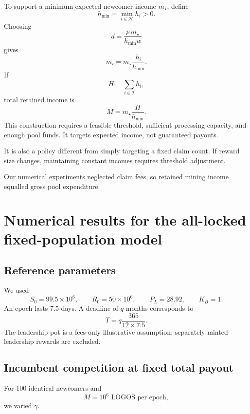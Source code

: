 \documentclass[11pt,a4paper]{article}
\begin{document}
To support a minimum expected newcomer income $m_\star$, define
\begin{equation}
h_{\min}=\min_{i\in\mathcal N}h_i>0.
\end{equation}
Choosing
\begin{equation}
d=\frac{p\,m_\star}{h_{\min}w}
\end{equation}
gives
\begin{equation}
m_i=m_\star\frac{h_i}{h_{\min}}.
\end{equation}
If
\begin{equation}
H=\sum_{i\in\mathcal I}h_i,
\end{equation}
total retained income is
\begin{equation}
M=m_\star\frac{H}{h_{\min}}.
\end{equation}
This construction requires a feasible threshold, sufficient processing capacity, and enough pool funds. It targets expected income, not guaranteed payouts.

It is also a policy different from simply targeting a fixed claim count. If reward size changes, maintaining constant incomes requires threshold adjustment.

Our numerical experiments neglected claim fees, so retained mining income equalled gross pool expenditure.

\section{Numerical results for the all-locked fixed-population model}\label{sec:numerics}
\subsection{Reference parameters}
We used
\begin{equation}
S_0=99.5\times10^6,\qquad R_0=50\times10^6,\qquad P_L=28.92,\qquad K_B=1.
\end{equation}
An epoch lasts $7.5$ days. A deadline of $q$ months corresponds to
\begin{equation}
T=q\frac{365}{12\times7.5}.
\end{equation}
The leadership pot is a fees-only illustrative assumption; separately minted leadership rewards are excluded.

\subsection{Incumbent competition at fixed total payout}
For 100 identical newcomers and
\begin{equation}
M=10^6\text{ LOGOS per epoch},
\end{equation}
we varied $\gamma$.
\end{document}
